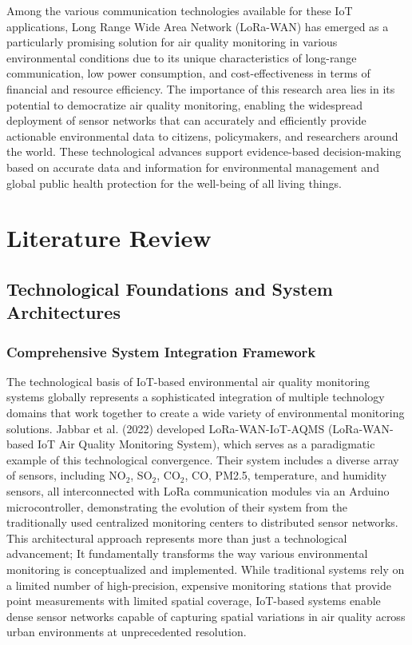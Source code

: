 \documentclass[conference]{IEEEtran}
\begin{document}
Among the various communication technologies available for these IoT applications, Long Range Wide Area Network (LoRa-WAN) has emerged as a particularly promising solution for air quality monitoring in various environmental conditions due to its unique characteristics of long-range communication, low power consumption, and cost-effectiveness in terms of financial and resource efficiency. The importance of this research area lies in its potential to democratize air quality monitoring, enabling the widespread deployment of sensor networks that can accurately and efficiently provide actionable environmental data to citizens, policymakers, and researchers around the world. These technological advances support evidence-based decision-making based on accurate data and information for environmental management and global public health protection for the well-being of all living things.

\section{Literature Review}
\subsection{Technological Foundations and System Architectures}
\subsubsection{Comprehensive System Integration Framework}
The technological basis of IoT-based environmental air quality monitoring systems globally represents a sophisticated integration of multiple technology domains that work together to create a wide variety of environmental monitoring solutions. Jabbar et al. (2022) developed LoRa-WAN-IoT-AQMS (LoRa-WAN-based IoT Air Quality Monitoring System), which serves as a paradigmatic example of this technological convergence. Their system includes a diverse array of sensors, including NO$_2$, SO$_2$, CO$_2$, CO, PM2.5, temperature, and humidity sensors, all interconnected with LoRa communication modules via an Arduino microcontroller, demonstrating the evolution of their system from the traditionally used centralized monitoring centers to distributed sensor networks. This architectural approach represents more than just a technological advancement; It fundamentally transforms the way various environmental monitoring is conceptualized and implemented. While traditional systems rely on a limited number of high-precision, expensive monitoring stations that provide point measurements with limited spatial coverage, IoT-based systems enable dense sensor networks capable of capturing spatial variations in air quality across urban environments at unprecedented resolution.~\cite{jabbar2022}
\end{document}
